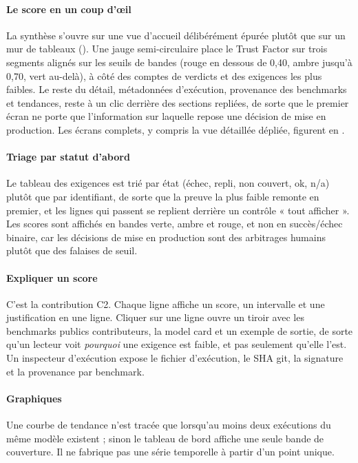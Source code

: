\documentclass[10pt,conference]{IEEEtran}
\begin{document}
\paragraph{Le score en un coup d'œil}
La synthèse s'ouvre sur une vue d'accueil délibérément épurée plutôt que sur un mur de tableaux ().
Une jauge semi-circulaire place le Trust Factor sur trois segments alignés sur les seuils de bandes (rouge en dessous de 0,40, ambre jusqu'à 0,70, vert au-delà), à côté des comptes de verdicts et des exigences les plus faibles.
Le reste du détail, métadonnées d'exécution, provenance des benchmarks et tendances, reste à un clic derrière des sections repliées, de sorte que le premier écran ne porte que l'information sur laquelle repose une décision de mise en production.
Les écrans complets, y compris la vue détaillée dépliée, figurent en .

\paragraph{Triage par statut d'abord}
Le tableau des exigences est trié par état (échec, repli, non couvert, ok, n/a) plutôt que par identifiant, de sorte que la preuve la plus faible remonte en premier, et les lignes qui passent se replient derrière un contrôle « tout afficher ».
Les scores sont affichés en bandes verte, ambre et rouge, et non en succès/échec binaire, car les décisions de mise en production sont des arbitrages humains plutôt que des falaises de seuil.

\paragraph{Expliquer un score}
C'est la contribution C2.
Chaque ligne affiche un score, un intervalle et une justification en une ligne.
Cliquer sur une ligne ouvre un tiroir avec les benchmarks publics contributeurs, la model card et un exemple de sortie, de sorte qu'un lecteur voit \emph{pourquoi} une exigence est faible, et pas seulement qu'elle l'est.
Un inspecteur d'exécution expose le fichier d'exécution, le SHA git, la signature et la provenance par benchmark.

\paragraph{Graphiques}
Une courbe de tendance n'est tracée que lorsqu'au moins deux exécutions du même modèle existent ; sinon le tableau de bord affiche une seule bande de couverture.
Il ne fabrique pas une série temporelle à partir d'un point unique.
\end{document}

